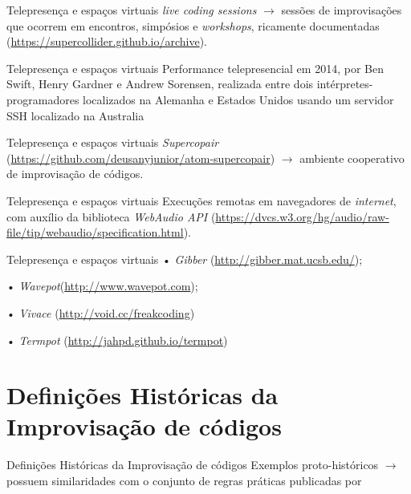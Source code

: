 \documentclass[aspectratio=169]{beamer}
\begin{document}
\begin{frame}{Telepresença e espaços virtuais}
\emph{live coding sessions} $\rightarrow$ sessões de improvisações que ocorrem em encontros, simpósios e \emph{workshops}, ricamente documentadas (\url{https://supercollider.github.io/archive}).
\end{frame}

\begin{frame}{Telepresença e espaços virtuais}
Performance telepresencial em 2014, por Ben Swift, Henry Gardner e Andrew Sorensen, realizada entre dois intérpretes-programadores localizados na Alemanha e Estados Unidos usando um servidor SSH localizado na Australia \cite[p.~152--153]{junior_supercopair_2015}
\end{frame}

\begin{frame}{Telepresença e espaços virtuais}
\emph{Supercopair} (\url{https://github.com/deusanyjunior/atom-supercopair}) $\rightarrow$ ambiente cooperativo de improvisação de códigos.
\end{frame}

\begin{frame}{Telepresença e espaços virtuais}
Execuções remotas em navegadores de \emph{internet}, com auxílio da biblioteca \emph{WebAudio API} (\url{https://dvcs.w3.org/hg/audio/raw-file/tip/webaudio/specification.html}).
\end{frame}

\begin{frame}{Telepresença e espaços virtuais}
• \emph{Gibber} \cite{roberts_gibber:_2012} (\url{http://gibber.mat.ucsb.edu/}); 

• \emph{Wavepot}(\url{http://www.wavepot.com});

• \emph{Vivace} \cite{vieira_vivace:_2015} (\url{http://void.cc/freakcoding})

• \emph{Termpot} \cite{lunhani_termpot_2015} (\url{http://jahpd.github.io/termpot})
\end{frame}

\section{Definições Históricas da Improvisação de códigos}
\begin{frame}{Definições Históricas da Improvisação de códigos}
Exemplos proto-históricos $\rightarrow$ possuem similaridades com o conjunto de regras práticas publicadas por \cite{ward_live_2004}
\end{frame}
\end{document}
